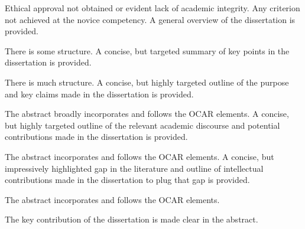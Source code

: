 \documentclass{../fal_assignment}
\begin{document}
\begin{markingrubric}
		\grade\fail Ethical approval not obtained or evident lack of academic integrity.
		\grade\fail Any criterion not achieved at the novice competency.
        \grade \fail 
      \grade A general overview of the dissertation is provided.
        	\par There is some structure.		
      \grade A concise, but targeted summary of key points in the dissertation is provided.
        	\par There is much structure.	      	
       \grade A concise, but highly targeted outline of the purpose and key claims made in the dissertation is provided.
        	\par The abstract broadly incorporates and follows the OCAR elements.	  
      \grade A concise, but highly targeted outline of the relevant academic discourse and potential contributions made in the dissertation is provided.
        	\par The abstract incorporates and follows the OCAR elements.	      	
       \grade A concise, but impressively highlighted gap in the literature and outline of intellectual contributions made in the dissertation to plug that gap is provided. 
        	\par The abstract incorporates and follows the OCAR elements.
        	\par The key contribution of the dissertation is made clear in the abstract.


\end{markingrubric}
\end{document}
